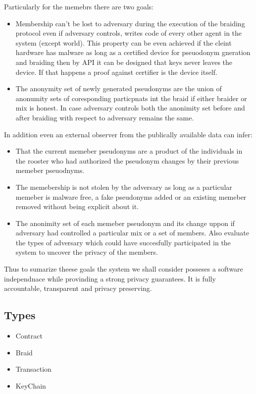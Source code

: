 \documentclass[12pt]{article}
\begin{document}
Particularly for the memebrs there are two goals:
\begin{itemize}
\item Membership can't be lost to adversary during the execution of the braiding protocol even if adversary controls, writes code of every other agent in the system (except world). This property can be even achieved if the cleint hardware has malware as long as a certified device for pseuodonym gneration and braiding then by API it can be designed that keys never leaves the device. If that happens a proof against certifier is the device itself.
\item The anonymity set of newly generated pseudonyms are the union of anonumity sets of coresponding particpnats int the braid if either braider or mix is honest. In case adversary controls both the anonimity set before and after braiding with respect to adversary remains the same. 
\end{itemize}

In addition even an external observer from the publically available data can infer:
\begin{itemize}
\item That the current memeber pseudonyms are a product of the individuals in the rooster who had authorized the pseudonym changes by their previous memeber pseuodnyms. 
\item The memebership is not stolen by the adversary as long as a particular memeber is malware free, a fake pseudonyms added or an existing memeber removed without being explicit about it.
\item The anonimity set of each memeber pseudonym and its change uppon if adversary had controlled a particular mix or a set of members. Also evaluate the types of adversary which could have succesfully participated in the system to uncover the privacy of the members. 
\end{itemize}

Thus to sumarize theese goals the system we shall consider posseses a software independnace while provinding a strong privacy guarantees. It is fully accountable, transparent and privacy preserving.

\subsection*{Types}
\begin{itemize}
\item Contract
\item Braid
\item Transaction
\item KeyChain
\end{itemize}
\end{document}
